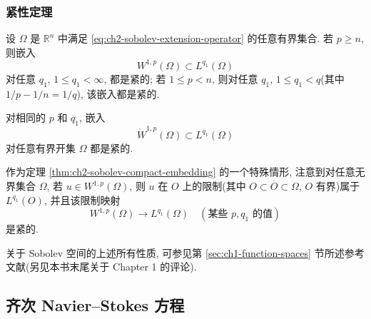 \subsubsection*{紧性定理}

\begin{Theorem}
\label{thm:ch2-sobolev-compact-embedding}
设 $\Omega$ 是 $\mathbb R^n$ 中满足 \eqref{eq:ch2-sobolev-extension-operator} 的任意有界集合. 若 $p\geq n$, 则嵌入
\begin{equation}
W^{1,p}(\Omega)\subset L^{q_1}(\Omega)
\label{eq:ch2-compact-embedding-bounded-domain}
\end{equation}
对任意 $q_1$, $1\leq q_1<\infty$, 都是紧的; 若 $1\leq p<n$, 则对任意 $q_1$, $1\leq q_1<q$(其中 $1/p-1/n=1/q$), 该嵌入都是紧的.

对相同的 $p$ 和 $q_1$, 嵌入
\begin{equation}
\mathring W^{1,p}(\Omega)\subset L^{q_1}(\Omega)
\label{eq:ch2-compact-embedding-zero-boundary}
\end{equation}
对任意有界开集 $\Omega$ 都是紧的.
\end{Theorem}

作为定理 \ref{thm:ch2-sobolev-compact-embedding} 的一个特殊情形, 注意到对任意无界集合 $\Omega$, 若 $u\in W^{1,p}(\Omega)$, 则 $u$ 在 $O$ 上的限制(其中 $O\subset\overline O\subset\Omega$, $O$ 有界)属于 $L^{q_1}(O)$, 并且该限制映射
\begin{equation}
W^{1,p}(\Omega)\longrightarrow L^{q_1}(\Omega)
\quad(\text{某些 }p,q_1\text{ 的值})
\label{eq:ch2-local-compact-restriction}
\end{equation}
是紧的.

\hypertarget{chapter-02-page-123}{}

关于 Sobolev 空间的上述所有性质, 可参见第 \ref{sec:ch1-function-spaces} 节所述参考文献(另见本书末尾关于 Chapter 1 的评论).

\subsection{齐次 Navier--Stokes 方程}
\label{subsec:ch2-homogeneous-navier-stokes}

